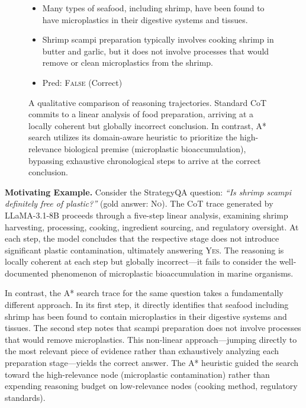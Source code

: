 \documentclass[11pt]{article}
\begin{document}
\begin{figure}[t]
\begin{tcolorbox}
\begin{minipage}[t]{0.48\textwidth}
\begin{itemize}
    \setlength{\itemsep}{2pt}
    \item[\textbf{Step 1:}] Many types of seafood, including shrimp, have been found to have microplastics in their digestive systems and tissues.
    \item[\textbf{Step 2:}] Shrimp scampi preparation typically involves cooking shrimp in butter and garlic, but it does not involve processes that would remove or clean microplastics from the shrimp.
    \item[\textbf{Ans:}] Pred: \textsc{False} (Correct)
\end{itemize}
\end{minipage}

\end{tcolorbox}
\vspace{-2mm}
\caption{A qualitative comparison of reasoning trajectories. Standard CoT commits to a linear analysis of food preparation, arriving at a locally coherent but globally incorrect conclusion. In contrast, A* search utilizes its domain-aware heuristic to prioritize the high-relevance biological premise (microplastic bioaccumulation), bypassing exhaustive chronological steps to arrive at the correct conclusion.}
\label{fig:motivating_example}
\end{figure}

\medskip

\noindent\textbf{Motivating Example.} Consider the StrategyQA question: \emph{``Is shrimp scampi definitely free of plastic?''} (gold answer: \textsc{No}). The CoT trace generated by LLaMA-3.1-8B proceeds through a five-step linear analysis, examining shrimp harvesting, processing, cooking, ingredient sourcing, and regulatory oversight. At each step, the model concludes that the respective stage does not introduce significant plastic contamination, ultimately answering \textsc{Yes}. The reasoning is locally coherent at each step but globally incorrect---it fails to consider the well-documented phenomenon of microplastic bioaccumulation in marine organisms.

In contrast, the A* search trace for the same question takes a fundamentally different approach. In its first step, it directly identifies that seafood including shrimp has been found to contain microplastics in their digestive systems and tissues. The second step notes that scampi preparation does not involve processes that would remove microplastics. This non-linear approach---jumping directly to the most relevant piece of evidence rather than exhaustively analyzing each preparation stage---yields the correct answer. The A* heuristic guided the search toward the high-relevance node (microplastic contamination) rather than expending reasoning budget on low-relevance nodes (cooking method, regulatory standards).
\end{document}
